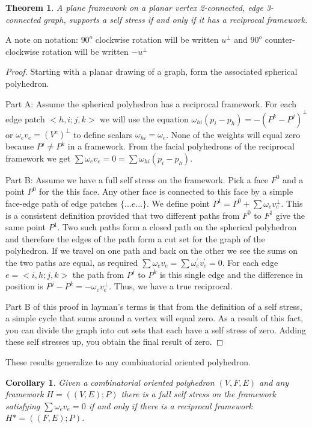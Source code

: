 \documentclass[11pt]{article}
\newtheorem{theorem}{Theorem}[section]
\newtheorem{corollary}{Corollary}[theorem]
\theoremstyle{definition}
\begin{document}
	\begin{theorem}
		A plane framework on a planar vertex 2-connected, edge 3-connected graph, supports a self stress if and only if it has a reciprocal framework.
	\end{theorem}
	
	A note on notation: $90^o$ clockwise rotation will be written $u^\bot$ and $90^o$ counter-clockwise rotation will be written $-u^\bot$
	
	\begin{proof}
		Starting with a planar drawing of a graph, form the associated spherical polyhedron.
		
		Part A: Assume the spherical polyhedron has a reciprocal framework.
		For each edge patch $<h,i;j,k>$ we will use the equation $\omega_{hi}(p_i - p_h) = -(P^k - P^j)^\bot$ or $\omega_ev_e = (V^e)^\bot$ to define scalars $\omega_{hi} = \omega_e$. 
		None of the weights will equal zero because $P^j \neq P^k$ in a framework. 
		From the facial polyhedrons of the reciprocal framework we get $\sum\omega_ev_e = 0 = \sum\omega_{hi}(p_i - p_h)$.

		Part B: Assume we have a full self stress on the framework.
		Pick a face $F^0$ and a point $P^0$ for the this face. 
		Any other face is connected to this face by a simple face-edge path of edge patches $\{...e...\}$. 
		We define point $P^1 = P^0 + \sum\omega_ev_e^\bot$. 
		This is a consistent definition provided that two different paths from $F^0$ to $F^1$ give the same point $P^1$. 
		Two such paths form a closed path on the spherical polyhedron and therefore the edges of the path form a cut set for the graph of the polyhedron. 
		If we travel on one path and back on the other we see the sums on the two paths are equal, as required $\sum\omega_ev_e = \sum\omega_e^{'}v_e^{'} = 0$. 
		For each edge $e = <i,h;j,k>$ the path from $P^j$ to $P^k$ is this single edge and the difference in position is $P^j - P^k = -\omega_ev_e^\bot$. 
		Thus, we have a true reciprocal.

		Part B of this proof in layman's terms is that from the definition of a self stress, a simple cycle that sums around a vertex will equal zero. 
		As a result of this fact, you can divide the graph into cut sets that each have a self stress of zero. 
		Adding these self stresses up, you obtain the final result of zero.
	\end{proof}
	
	These results generalize to any combinatorial oriented polyhedron.
	
	\begin{corollary} 
		Given a combinatorial oriented polyhedron $(V,F,E)$ and any framework $H = ((V,E);P)$ there is a full self stress on the framework satisfying $\sum \omega_ev_e = 0$ if and only if there is a reciprocal framework $H* = ((F,E);P)$. 
	\end{corollary}
\end{document}
